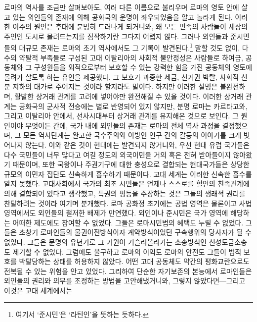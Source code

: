 로마의 역사를 조금만 살펴보아도,
여러 다른 이름으로 불리우며
로마의 영토 안에
살고 있는 외인들의 존재에 의해 공화국의 운명이
좌우되었음을 알고 놀라게 된다.
이러한 이주의 원인은 후대에 분명히 드러나게 되거니와,
왜 모든 민족의 사람들이 세상의 주인인 도시로 몰려드는지를
짐작하기란 그다지 어렵지 않다.
그러나 외인들과 준시민들의 대규모 존재는
로마의 초기 역사에서도 그 기록이 발견된다.\footnote{여기서 `준시민'은
`라틴인'을 뜻하는 듯하다.}
말할 것도 없이,
다수의 약탈적 부족들로 구성된 고대 이탈리아의 사회적 불안정성은
사람들로 하여금, 공동체와 그 구성원들을 외적으로부터 보호할 수 있는
강력한 힘을 가진 공동체의 영토에 몰려가 살도록 하는 유인을 제공했다.
그 보호가 과중한 세금, 선거권 박탈, 사회적 신분 저하의 대가로
주어지는 것이라 할지라도 말이다.
하지만 이러한 설명은 불완전하며,
활발한 상거래 관계를 고려에 넣어야만 완전해질 수 있을 것이다.
이러한 상거래 관계는 공화국의 군사적 전승에는
별로 반영되어 있지 않지만,
분명 로마는 카르타고와, 그리고 이탈리아 안에서,
선사시대부터 상거래 관계를 유지해온 것으로 보인다.
그 원인이야 무엇이든 간에,
국가 내에 외인들의 존재는
로마의 전체 역사 과정을 결정했으며,
그 모든 역사단계는 완고한 국수주의와 이방인 인구 간의 갈등의 이야기를
크게 벗어나지 않는다.
이와 같은 것이 현대에는 발견되지 않거니와,
우선 현대 유럽 국가들은 다수 국민들이 너무 많다고 여길 정도의
외국이민을 거의 혹은 전혀 받아들이지 않아왔기 때문이며,
또한
국왕이나 주권기구에 대한 충성으로 결합되는 현대국가들은
상당한 규모의 이민자 집단도
신속하게 흡수하기 때문이다.
고대 세계는 이러한 신속한 흡수를 알지 못했다.
고대사회에서 국가의 최초 시민들은 언제나 스스로를 혈연의 친족관계에 의해
결합되어 있다고 생각했고,
특권의 평등을 주장하는 것은 그들의 생래적 권리를 찬탈하려는 것이라
여기며 분개했다.
로마 공화정 초기에는
공법 영역은 물론이고 사법 영역에서도
외인들의 철저한 배제가 만연했다.
외인이나 준시민은
국가 영역에 해당하는 어떠한 제도에도 참여할 수 없었다.
그들은 로마시민법의 혜택도 누릴 수 없었다.
그들은 초창기 로마인들의 물권이전방식이자 계약방식이었던
구속행위의 당사자가 될 수 없었다.
그들은 문명의 유년기로 그 기원이 거슬러올라가는 소송방식인
신성도금소송도 제기할 수 없었다.
그럼에도 불구하고 로마의 이익도 로마의 안전도 그들이 법적 보호를 박탈당하는
상태를 허용하지 않았다.
어떤 고대 공동체도 약간의 평화교란으로도 전복될 수 있는 위험을 안고 있었다.
그리하여 단순한 자기보존의 본능에서 로마인들은
외인들의 권리와 의무를 조정하는 방법을 고안해냈거니와,
그렇지 않았다면---그리고 이것은 고대 세계에서는
